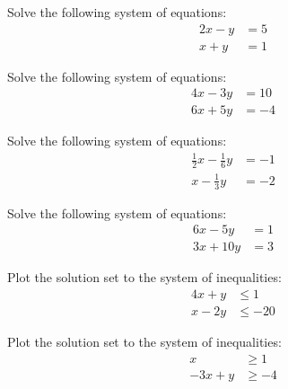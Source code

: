 \documentclass[11pt,letterpaper]{article}
\begin{document}

 Solve the following system of equations:
	\[
	\begin{aligned}
	2x - y&= 5 \\
	x + y&= 1
	\end{aligned}
	\]



\newpage



 Solve the following system of equations:
	\[
	\begin{aligned}
	4x - 3y&= 10 \\
	6x + 5y&= -4
	\end{aligned}
	\]



\newpage



 Solve the following system of equations:
	\[
	\begin{aligned}
	\frac{1}{2}x - \frac{1}{6}y&= -1 \\
	x - \frac{1}{3}y&= -2 
	\end{aligned}
	\]



\newpage



 Solve the following system of equations:
	\[
	\begin{aligned}
	6x - 5y&= 1 \\
	3x + 10y&= 3
	\end{aligned}
	\]



\newpage



 Plot the solution set to the system of inequalities: 
	\[
	\begin{aligned}
	4x + y&\leq 1 \\
	x - 2y&\leq -20
	\end{aligned}
	\]



\newpage



 Plot the solution set to the system of inequalities: 
	\[
	\begin{aligned}
	x&\geq 1 \\
	-3x + y&\geq -4
	\end{aligned}
	\]
\end{document}
